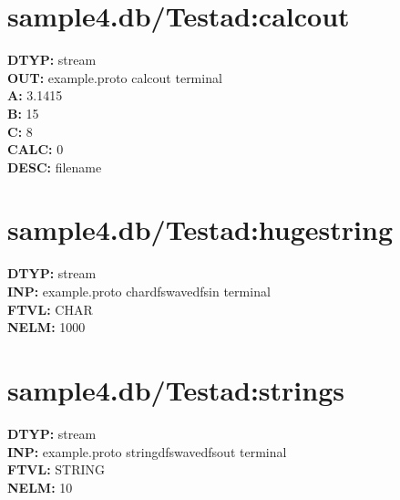 \documentclass[12pt]{article}
\begin{document}
\section{sample4.db/Test\textunderscore ad:calcout}
\textbf{DTYP: }stream \\
\textbf{OUT: }example.proto calcout terminal \\
\textbf{A: }3.1415 \\
\textbf{B: }15 \\
\textbf{C: }8 \\
\textbf{CALC: }0 \\
\textbf{DESC: }filename \\
\newpage
\section{sample4.db/Test\textunderscore ad:hugestring}
\textbf{DTYP: }stream \\
\textbf{INP: }example.proto chardfswavedfsin terminal \\
\textbf{FTVL: }CHAR \\
\textbf{NELM: }1000 \\
\newpage
\section{sample4.db/Test\textunderscore ad:strings}
\textbf{DTYP: }stream \\
\textbf{INP: }example.proto stringdfswavedfsout terminal \\
\textbf{FTVL: }STRING \\
\textbf{NELM: }10 \\
\newpage
\end{document}
